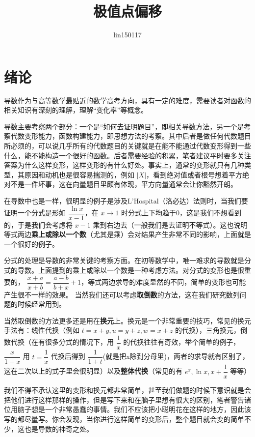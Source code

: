 \documentclass[a4paper,10pt]{article}
\begin{document}
\title{极值点偏移}
\author{lin150117}
\maketitle
\tableofcontents
\noindent
\section{绪论}
导数作为与高等数学最贴近的数学高考方向，具有一定的难度，需要读者对函数的相关知识有深刻的理解，理解“变化率”等概念。

导数主要考察两个部分：一个是“如何去证明题目”，即相关导数方法，另一个是考察代数变形能力，函数构建能力，即思想方法的考察。其中后者是做任何代数题目所必须的，可以说几乎所有的代数题目的关键就是在能不能通过代数变形得到一些什么，能不能构造一个很好的函数。后者需要经验的积累，笔者建议平时要多关注答案为什么这样变形，这样变形的有什么好处。事实上，通常的变形就只有几种类型，其原因和动机也是很容易揣测的，例如 $ |X|  $，看到绝对值或者根号想着平方绝对不是一件坏事，这在向量题目里颇有体现，平方向量通常会让你豁然开朗。

在导数中也是一样，很明显的例子是涉及L'Hospital（洛必达）法则时，当我们要证明一个分式是形如 $ \dfrac{\ln x}{x-1} $，在 $ x\rightarrow1  $ 时分式上下均趋于0，这是我们不想看到的，于是我们会考虑将 $ x-1  $ 乘到右边去（一般我们是去证明不等式）。这也说明等式两边\textbf{乘上或除以一个数}（尤其是乘）会对结果产生非常不同的影响，上面就是一个很好的例子。

分式的处理是导数的非常关键的考察方面。在初等数学中，唯一难求的导数就是分式的导数。上面提到的乘上或除以一个数是一种考虑方法。对分式的变形也是很重要的， $ \dfrac{x+a}{x+b }=\dfrac{a-b}{b+x}+1 $，等式两边求导的难度显然的不同，简单的变形也可能产生很不一样的效果。 当然我们还可以考虑\textbf{取倒数}的方法，这在我们研究数列问题的时候经常用到。

当然取倒数的方法更多还是用在\textbf{换元}上。换元是一个非常重要的技巧，常见的换元手法有：线性代换（例如 $ t=x+y,u=y+z,w=x+z $ 的代换），三角换元，倒数代换（在有很多分式的情况下，用 $ \dfrac{1}{x} $ 的代换往往有奇效，举个简单的例子， $ \dfrac{x }{1+x} $ 用 $ t=\dfrac{1 }{x} $ 代换后得到 $ \dfrac{1}{1+t} $(就是把x除到分母里)，两者的求导就有区别了，这在二次以上的式子里会很明显）以及\textbf{整体代换}（常见的有 $ e^x,\ln x,x+\dfrac{1}{x} $ 等等）

我们不得不承认这里的变形和换元都非常简单，甚至我们做题的时候下意识就是会把他们进行这样那样的操作，但是写下来和在脑子里想有很大的区别，笔者警告诸位用脑子想是一个非常愚蠢的事情。我们不应该把小聪明花在这样的地方，因此该写的都尽量写。你会发现，当你进行这样简单的变形后，整个题目就会变的简单不少，这也是导数的神奇之处。
\end{document}
